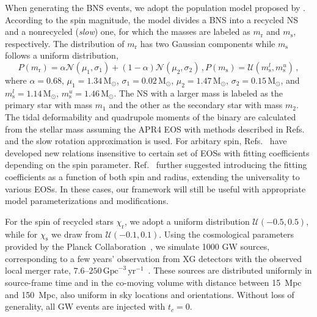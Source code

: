 \documentclass[a4paper,11pt]{article}
\begin{document}
When generating the BNS events, we adopt the population model proposed by
\citet{Farrow:2019xnc}.  According to the spin magnitude, the model divides a
BNS into a recycled NS and a nonrecycled (\emph{slow}) one, for which the masses
are labeled as $m_{\mathrm{r}}$ and $m_{\mathrm{s}}$, respectively.  The
distribution of $m_{\mathrm{r}}$ has two Gaussian components while
$m_{\mathrm{s}}$ follows a uniform distribution,
\begin{subequations}
\label{mass population}
\begin{equation}
    P(m_{\mathrm{r}}) = \alpha \mathcal{N}(\mu_1, \sigma_1) + (1-\alpha)
    \mathcal{N}(\mu_2, \sigma_2)\,,
\end{equation}
\begin{equation}
    P(m_{\mathrm{s}}) = \mathcal{U}(m_{\mathrm{s}}^l, m_{\mathrm{s}}^u)\,,
\end{equation}
\end{subequations}
where $\alpha=0.68$, $\mu_1=1.34\, \mathrm{M}_{\odot}$, $\sigma_1=0.02\,
\mathrm{M}_ {\odot}$, $\mu_2=1.47\, \mathrm{M}_{\odot}$, $\sigma_2=0.15\,
\mathrm{M}_{\odot}$, and $m_{\mathrm{s}}^l =1.14\, \mathrm{M}_{\odot}$,
$m_{\mathrm{s}}^u =1.46\, \mathrm{M}_{\odot}$. The NS with a larger mass is
labeled as the primary star with mass $m_1$ and the other as the secondary star
with mass $m_2$.  The tidal deformability and quadrupole moments of the binary
are calculated from the stellar mass assuming the APR4 EOS with methods
described in Refs.~\cite{Yagi:2013awa, Atta:2024ckt} and the slow rotation approximation is used. 
For arbitary spin, Refs.~\cite{Doneva:2013rha, Pappas:2013naa, Yagi:2014bxa, Doneva:2014faa} have developed new
relations insensitive to certain set of EOSs with fitting coefficients depending on the spin parameter. 
Ref.~\cite{Chakrabarti:2013tca} further suggested introducing the fitting
coefficients as a function of both spin and radius, extending the
universality to various EOSs. In these cases, our framework
will still be useful with appropriate model parameterizations and modifications.

For the spin of recycled
stars $\chi_{\mathrm{r}}$, we adopt a uniform distribution
$\mathcal{U}(-0.5,0.5)$, while for $\chi_{\mathrm{s}}$ we draw from
$\mathcal{U}(-0.1,0.1)$.  Using the cosmological parameters provided by the
Planck Collaboration~\cite{Planck:2018vyg}, we simulate 1000 GW sources,
corresponding to a few years' observation from XG detectors with the observed
local merger rate, $7.6$--$250\, \mathrm{Gpc}^{-3} \,
\mathrm{yr}^{-1}$~\cite{LIGOScientific:2025pvj, LIGOScientific:2020aai}.  These
sources are distributed uniformly in source-frame time and in the co-moving
volume with distance between 15~Mpc and 150~Mpc, also uniform in sky locations
and orientations. Without loss of generality, all GW events are injected with
$t_{c}=0$.
\end{document}
